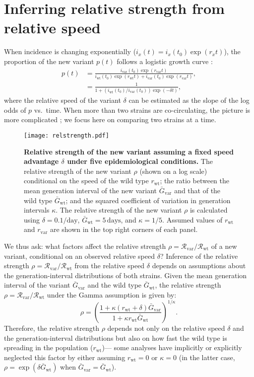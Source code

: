 \documentclass[12pt]{article}
\newcommand{\vvvar}{\mathrm{var}}
\newcommand{\wwwt}{\mathrm{wt}}
\newcommand{\rx}[1]{\ensuremath{{r}_{#1}}\xspace}
\newcommand{\rw}{\rx{\wwwt}}
\newcommand{\rv}{\rx{\vvvar}}
\newcommand{\Rx}[1]{\ensuremath{{\mathcal R}_{#1}}\xspace}
\newcommand{\Rw}{\Rx{\wwwt}}
\newcommand{\Rv}{\Rx{\vvvar}}
\newcommand{\days}{\ensuremath{\, \textrm{days}}}
\newcommand{\pday}{\ensuremath{/\textrm{day}}}
\newcommand{\ix}[1]{\ensuremath{{i}_{#1}}\xspace}
\newcommand{\iw}{\ix{\wwwt}}
\newcommand{\iv}{\ix{\vvvar}}
\newcommand{\Gx}[1]{\ensuremath{{\bar G}_{#1}}\xspace}
\newcommand{\Gw}{\Gx{\wwwt}}
\newcommand{\Gv}{\Gx{\vvvar}}
\begin{document}
\section{Inferring relative strength from relative speed}

When incidence is changing exponentially ($i_x(t) = i_x(t_0) \exp(r_x t)$), the proportion of the new variant $p(t)$ follows a logistic growth curve \citep{switzerland2021variant,davies2021estimated}:
\begin{align}
p(t) &= \frac{\iv(t_0) \exp(\rv t)}{\iw(t_0) \exp(\rw t) + \iv(t_0) \exp(\rv t)},
\\ &= \frac{1}{1 + \left(\iw(t_0)/\iv(t_0)\right) \exp(-\delta t)},
\end{align}
where the relative speed of the variant $\delta$ can be estimated as the slope of the log odds of $p$  vs.~time.
When more than two strains are co-circulating, the picture is more complicated \citep{campbell2021increased}; we focus here on comparing two strains at a time.

\begin{figure}[!t]
\texttt{[image: relstrength.pdf]}
\caption{
\textbf{Relative strength of the new variant assuming a fixed speed advantage $\delta$ under five epidemiological conditions.}
The relative strength of the new variant $\rho$ (shown on a log scale) conditional on the speed of the wild type $\rw$; the ratio between the mean generation interval of the new variant $\Gv$ and that of the wild type $\Gw$; and the squared coefficient of variation in generation intervals $\kappa$.
The relative strength of the new variant $\rho$ is calculated using $\delta=0.1\pday$, $\Gw = 5\days$, and $\kappa = 1/5$.
Assumed values of $\rw$ and $\rv$ are shown in the top right corners of each panel.
}
\label{fig:relstrength}
\end{figure}

We thus ask: what factors affect the relative strength $\rho = \Rv/\Rw$ of a new variant, conditional on an observed relative speed $\delta$?
Inference of the relative strength $\rho = \Rv/\Rw$ from the relative speed $\delta$ depends on assumptions about the generation-interval distributions of both strains.
Given the mean generation interval of the variant $\Gv$ and the wild type $\Gw$, the relative strength $\rho = \Rv/\Rw$ under the Gamma assumption \citep{park2019practical} is given by:
\begin{equation}
\rho = \left(\frac{1 + \kappa (\rw + \delta) \Gv}{1 + \kappa \rw \Gw}\right)^{1/\kappa}.
\end{equation}
Therefore, the relative strength $\rho$ depends not only on the relative speed $\delta$ and the generation-interval distributions but also on how fast the wild type is spreading in the population (\rw)---
some analyses have implicitly or explicitly neglected this factor by either assuming $\rw = 0$ \citep{switzerland2021variant} or $\kappa = 0$ \citep{davies2021estimated} (in the latter case, $\rho = \exp(\delta \Gw)$ when $\Gv=\Gw$).
\end{document}
